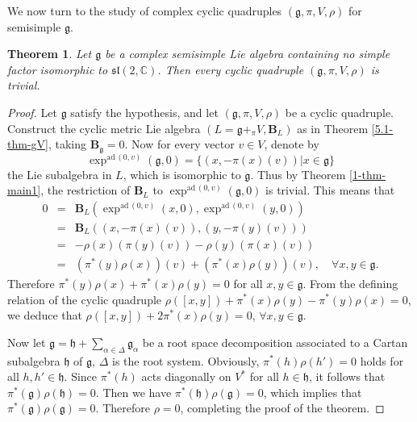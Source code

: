 \documentclass[reqno]{amsart}
\newtheorem{thm}{Theorem}[section]
\theoremstyle{definition}
\begin{document}
We now turn to the study of complex cyclic quadruples $(\mathfrak{g},\pi,V,\rho)$ for semisimple $\mathfrak{g}$.
\begin{thm}\label{5-thm-com-trivial}
Let $\mathfrak{g}$ be a complex semisimple Lie algebra containing no simple factor isomorphic to $\mathfrak{sl}(2,\mathbb{C})$.
Then every cyclic quadruple $(\mathfrak{g},\pi,V,\rho)$ is trivial.
\end{thm}
\begin{proof}
Let $\mathfrak{g}$ satisfy the hypothesis, and let
$(\mathfrak{g},\pi,V,\rho)$ be a cyclic quadruple.
Construct the cyclic metric Lie algebra
$(L=\mathfrak{g}+_{\pi}V,\mathbf{B}_{L})$ as in Theorem \ref{5.1-thm-gV}, taking $\mathbf{B}_{\mathfrak{g}}=0$.
Now for every vector $v\in V$, denote by
$$\exp^{\mathrm{ad}\,(0,v)}(\mathfrak{g},0)=\{(x,-\pi(x)(v))|x\in \mathfrak{g}\}$$
 the Lie subalgebra in $L$, which is  isomorphic to $\mathfrak{g}$.
 Thus by Theorem \ref{1-thm-main1}, the restriction of $\mathbf{B}_{L}$ to $\exp^{\mathrm{ad}\,(0,v)}(\mathfrak{g},0)$ is trivial. This means that
\begin{eqnarray*}
  0 &=& \mathbf{B}_{L}(\exp^{\mathrm{ad}\,(0,v)}(x,0),\exp^{\mathrm{ad}\,(0,v)}(y,0)) \\
   &=& \mathbf{B}_{L}((x,-\pi(x)(v)),(y,-\pi(y)(v))) \\
   &=& -\rho(x)(\pi(y)(v))-\rho(y)(\pi(x)(v)) \\
   &=&  (\pi^{*}(y)\rho(x))(v)+(\pi^{*}(x)\rho(y))(v),\quad \forall x,y\in \mathfrak{g}.
\end{eqnarray*}
Therefore $\pi^{*}(y)\rho(x)+\pi^{*}(x)\rho(y)=0$ for all $x,y\in \mathfrak{g}$.
From the defining relation of the cyclic quadruple  $\rho([x,y])+\pi^{\ast}(x)\rho(y)-\pi^{\ast}(y)\rho(x)=0$,
we deduce that
$\rho([x,y])+2\pi^{\ast}(x)\rho(y)=0$, $\forall x,y\in\mathfrak{g}$.

Now let $\mathfrak{g}=\mathfrak{h}+\sum_{\alpha\in \Delta}\mathfrak{g}_{\alpha}$
be a root space decomposition associated  to a Cartan subalgebra $\mathfrak{h}$ of
$\mathfrak{g}$, $\Delta$ is the root system. Obviously, $\pi^{\ast}(h)\rho(h')=0$ holds for all
$h,h'\in \mathfrak{h}$.
Since  $\pi^{\ast}(h)$ acts diagonally on $V^{*}$ for all $h\in \mathfrak{h}$,
it follows that  $\pi^{\ast}(\mathfrak{g})\rho(\mathfrak{h})=0$.
Then we have $\pi^{\ast}(\mathfrak{h})\rho(\mathfrak{g})=0$, which implies that
 $\pi^{\ast}(\mathfrak{g})\rho(\mathfrak{g})=0$.
Therefore  $\rho=0$, completing the proof of the theorem.
\end{proof}
\end{document}
